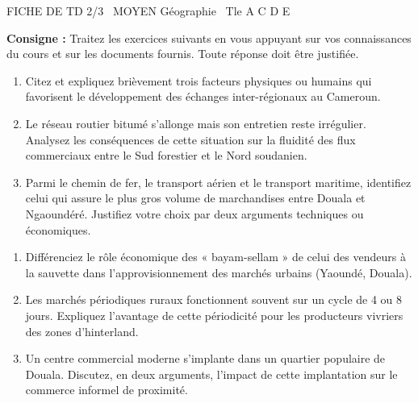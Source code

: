 \documentclass[11pt]{article}
\begin{document}
\begin{tcolorbox}[enhanced,colback=popink,colframe=popink,arc=10pt,boxrule=0pt,left=12pt,right=12pt,top=9pt,bottom=9pt]
{\color{white}\popxbold\small FICHE DE TD 2/3 \textbullet\ MOYEN \hfill Géographie \textbullet\ Tle A C D E\par}
\end{tcolorbox}
\vspace{4pt}
\noindent\textbf{Consigne :} Traitez les exercices suivants en vous appuyant sur vos connaissances du cours et sur les documents fournis. Toute réponse doit être justifiée.

\begin{exercice}
\begin{enumerate}
    \item Citez et expliquez brièvement trois facteurs physiques ou humains qui favorisent le développement des échanges inter-régionaux au Cameroun.
    \item Le réseau routier bitumé s'allonge mais son entretien reste irrégulier. Analysez les conséquences de cette situation sur la fluidité des flux commerciaux entre le Sud forestier et le Nord soudanien.
    \item Parmi le chemin de fer, le transport aérien et le transport maritime, identifiez celui qui assure le plus gros volume de marchandises entre Douala et Ngaoundéré. Justifiez votre choix par deux arguments techniques ou économiques.
\end{enumerate}
\end{exercice}

\begin{exercice}
\begin{enumerate}
    \item Différenciez le rôle économique des « bayam-sellam » de celui des vendeurs à la sauvette dans l'approvisionnement des marchés urbains (Yaoundé, Douala).
    \item Les marchés périodiques ruraux fonctionnent souvent sur un cycle de 4 ou 8 jours. Expliquez l'avantage de cette périodicité pour les producteurs vivriers des zones d'hinterland.
    \item Un centre commercial moderne s'implante dans un quartier populaire de Douala. Discutez, en deux arguments, l'impact de cette implantation sur le commerce informel de proximité.
\end{enumerate}
\end{exercice}
\end{document}

